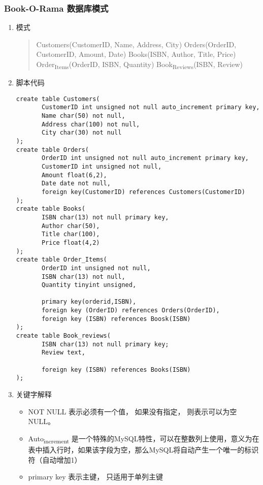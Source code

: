 \documentclass[11pt]{article}
\begin{document}
\subsubsection{Book-O-Rama 数据库模式}
\label{sec:org08cad1d}
\begin{enumerate}
\item 模式
\label{sec:orgd39d541}
\begin{quote}
Customers(CustomerID, Name, Address, City)
Orders(OrderID, CustomerID, Amount, Date)
Books(ISBN, Author, Title, Price)
Order\textsubscript{Items}(OrderID, ISBN, Quantity)
Book\textsubscript{Reviews}(ISBN, Review)
\end{quote}
\item 脚本代码
\label{sec:org89967c7}
\begin{verbatim}
create table Customers(
       CustomerID int unsigned not null auto_increment primary key,
       Name char(50) not null,
       Address char(100) not null,
       City char(30) not null
);
create table Orders(
       OrderID int unsigned not null auto_increment primary key,
       CustomerID int unsigned not null,
       Amount float(6,2),
       Date date not null,
       foreign key(CustomerID) references Customers(CustomerID)
);
create table Books(
       ISBN char(13) not null primary key,
       Author char(50),
       Title char(100),
       Price float(4,2)
);
create table Order_Items(
       OrderID int unsigned not null,
       ISBN char(13) not null,
       Quantity tinyint unsigned,

       primary key(orderid,ISBN),
       foreign key (OrderID) references Orders(OrderID),
       foreign key (ISBN) references Boosk(ISBN)
);
create table Book_reviews(
       ISBN char(13) not null primary key;
       Review text,

       foreign key (ISBN) references Books(ISBN)
);

\end{verbatim}
\item 关键字解释
\label{sec:org41ea8cf}
\begin{itemize}
\item NOT NULL
表示必须有一个值， 如果没有指定， 则表示可以为空NULL。
\item Auto\textsubscript{increment}
是一个特殊的MySQL特性，可以在整数列上使用，意义为在表中插入行时，如果该字段为空，那么MySQL将自动产生一个唯一的标识符（自动增加1）
\item primary key
表示主键， 只适用于单列主键
\end{itemize}
\end{enumerate}
\end{document}

